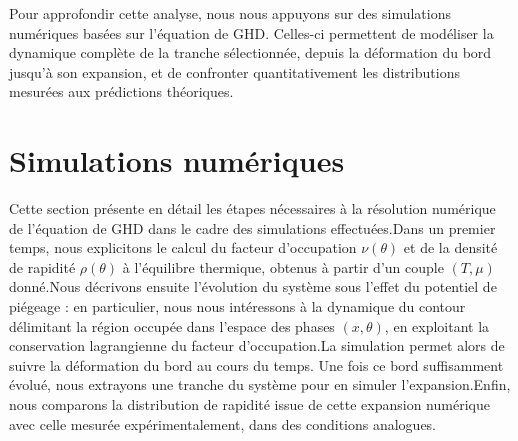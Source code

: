 \medskip

Pour approfondir cette analyse, nous nous appuyons sur des simulations numériques basées sur l’équation de \gls*{GHD}. Celles-ci permettent de modéliser la dynamique complète de la tranche sélectionnée, depuis la déformation du bord jusqu’à son expansion, et de confronter quantitativement les distributions mesurées aux prédictions théoriques.


\section{Simulations numériques}
\label{sec:simulations}

Cette section présente en détail les étapes nécessaires à la résolution numérique de l’équation de \gls*{GHD} dans le cadre des simulations effectuées.Dans un premier temps, nous explicitons le calcul du facteur d’occupation $\nu(\theta)$ et de la densité de rapidité $\rho(\theta)$ à l’équilibre thermique, obtenus à partir d’un couple $(T, \mu)$ donné.Nous décrivons ensuite l’évolution du système sous l’effet du potentiel de piégeage : en particulier, nous nous intéressons à la dynamique du contour délimitant la région occupée dans l’espace des phases $(x, \theta)$, en exploitant la conservation lagrangienne du facteur d’occupation.La simulation permet alors de suivre la déformation du bord au cours du temps. Une fois ce bord suffisamment évolué, nous extrayons une tranche du système pour en simuler l’expansion.Enfin, nous comparons la distribution de rapidité issue de cette expansion numérique avec celle mesurée expérimentalement, dans des conditions analogues.


